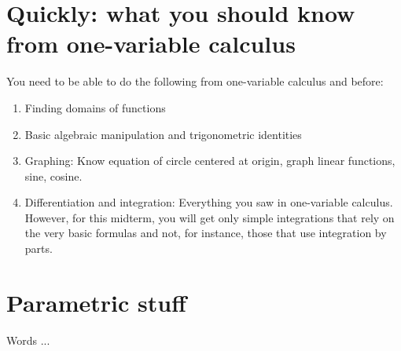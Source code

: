 \documentclass[10pt]{amsart}
\begin{document}
\section{Quickly: what you should know from one-variable calculus}

You need to be able to do the following from one-variable calculus and
before:

\begin{enumerate}
\item Finding domains of functions
\item Basic algebraic manipulation and trigonometric identities
\item Graphing: Know equation of circle centered at origin, graph
  linear functions, sine, cosine.
\item Differentiation and integration: Everything you saw in
  one-variable calculus. However, for this midterm, you will get only
  simple integrations that rely on the very basic formulas and not,
  for instance, those that use integration by parts.
\end{enumerate}

\section{Parametric stuff}

Words ...
\end{document}
